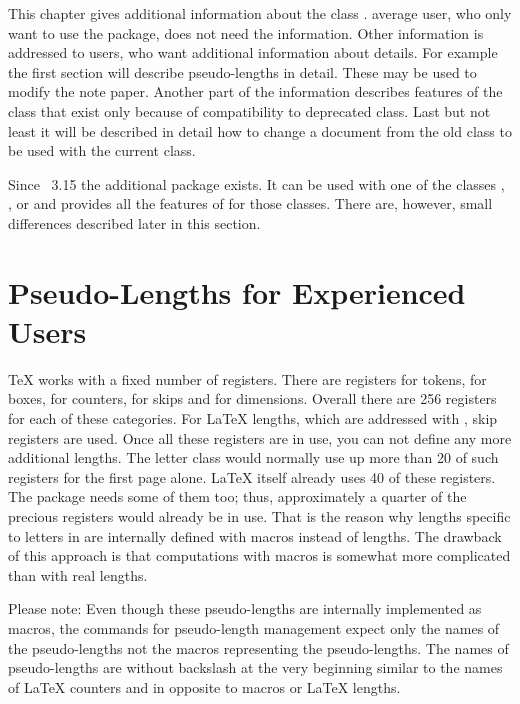 This chapter gives additional information about the \KOMAScript{} class
.  average user, who only want to use the package,
does not need the information. Other information is addressed to users, who
want additional information about details. For example the first section will
describe pseudo-lengths in detail. These may be used to modify the note paper.
Another part of the information describes features of the class that exist
only because of compatibility to deprecated  class. Last but
not least it will be described in detail how to change a document from the old
 class to be used with the current  class.

Since \KOMAScript~3.15 the
additional package  exists. It can
be used with one of the \KOMAScript{} classes ,
, or  and provides all the features of
 for those classes. There are, however, small differences
described later in this section.%


\section{Pseudo-Lengths for Experienced Users}
\BeginIndexGroup
{}

{\TeX} works with a fixed number of registers. There are registers for tokens,
for boxes, for counters, for skips and for dimensions.  Overall there are 256
registers for each of these categories. For {\LaTeX} lengths, which are
addressed with , skip registers are used. Once all these
registers are in use, you can not define any more additional lengths.  The
letter class  would normally use up more than 20 of such
registers for the first page alone. {\LaTeX} itself already uses 40 of these
registers. The  package needs some of them too; thus,
approximately a quarter of the precious registers would already be in
use. That is the reason why lengths specific to letters in 
are internally defined with macros instead of lengths. The drawback of this
approach is that computations with macros is somewhat more complicated than
with real lengths.

Please note: Even though these pseudo-lengths are
internally implemented as macros, the commands for pseudo-length management
expect only the names of the pseudo-lengths not the macros representing the
pseudo-lengths. The names of pseudo-lengths are without backslash at the very
beginning similar to the names of \LaTeX{} counters and in opposite to macros
or \LaTeX{} lengths.

